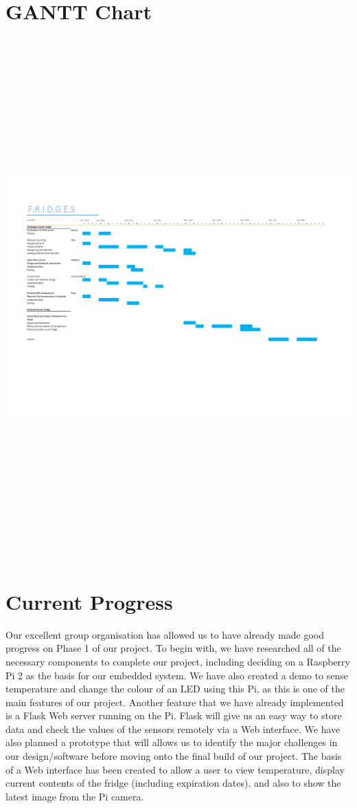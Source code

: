 \documentclass[10pt]{article}
\begin{document}
\section{GANTT Chart}
\includegraphics[height=20cm, width=23cm,angle=90]{GANTT.pdf}

\newpage
\section{Current Progress}

Our excellent group organisation has allowed us to have already made good progress on Phase 1 of our project. To begin with, we have researched all of the necessary components to complete our project, including deciding on a Raspberry Pi 2 as the basis for our embedded system. We have also created a demo to sense temperature and change the colour of an LED using this Pi, as this is one of the main features of our project. Another feature that we have already implemented is a Flask Web server running on the Pi. Flask will give us an easy way to store data and check the values of the sensors remotely via a Web interface. We have also planned a prototype that will allows us to identify the major challenges in our design/software before moving onto the final build of our project. The basis of a Web interface has been created to allow a user to view temperature, display current contents of the fridge (including expiration dates), and also to show the latest image from the Pi camera.
\end{document}

